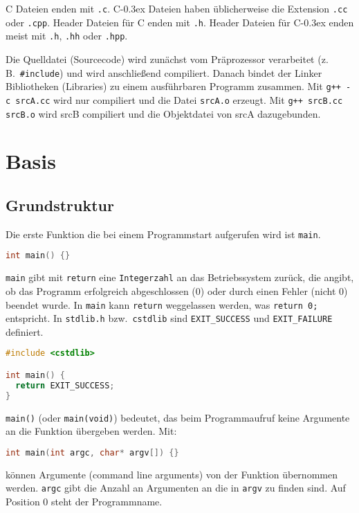 \documentclass[10pt,twocolumn]{scrartcl}
\newcommand*\cpp{C\kern-0.3ex\raisebox{0.17ex}{\texttt{+\kern-0.3ex+}}}
\begin{document}
C Dateien enden mit \lstinline|.c|. \cpp{} Dateien haben üblicherweise die
Extension \lstinline|.cc| oder \lstinline|.cpp|. Header Dateien für C enden mit
\lstinline|.h|. Header Dateien für \cpp{} enden meist mit \lstinline|.h|,
\lstinline|.hh| oder \lstinline|.hpp|.

Die Quelldatei (Sourcecode) wird zunächst vom Präprozessor verarbeitet (z.\,B.\
\lstinline|#include|) und wird anschließend compiliert. Danach bindet der Linker
Bibliotheken (Libraries) zu einem ausführbaren Programm zusammen. Mit
\lstinline|g++ -c srcA.cc| wird nur compiliert und die Datei \lstinline|srcA.o|
erzeugt. Mit \lstinline|g++ srcB.cc srcB.o| wird srcB compiliert und die
Objektdatei von srcA dazugebunden.

\section{Basis}
\label{sec:einleitung}

\subsection{Grundstruktur}

Die erste Funktion die bei einem Programmstart aufgerufen wird ist
\lstinline|main|.
\begin{lstlisting}[language=C++]
int main() {}
\end{lstlisting}
\lstinline|main| gibt mit \lstinline|return| eine \lstinline|Integerzahl| an das
Betriebssystem zurück, die angibt, ob das Programm erfolgreich abgeschlossen (0)
oder durch einen Fehler (nicht 0) beendet wurde. In \lstinline|main| kann
\lstinline|return| weggelassen werden, was \lstinline|return 0;| entspricht. In
\lstinline|stdlib.h| bzw.\ \lstinline|cstdlib| sind \lstinline|EXIT_SUCCESS| und
\lstinline|EXIT_FAILURE| definiert.
\begin{lstlisting}[language=C++]
#include <cstdlib>

int main() {
  return EXIT_SUCCESS;
}
\end{lstlisting}
\lstinline|main()| (oder \lstinline|main(void)|) bedeutet, das beim
Programmaufruf keine Argumente an die Funktion übergeben werden. Mit:
\begin{lstlisting}[language=C++]
int main(int argc, char* argv[]) {}
\end{lstlisting}
können Argumente (command line arguments) von der Funktion übernommen werden.
\lstinline|argc| gibt die Anzahl an Argumenten an die in \lstinline|argv| zu
finden sind. Auf Position 0 steht der Programmname.
\end{document}
